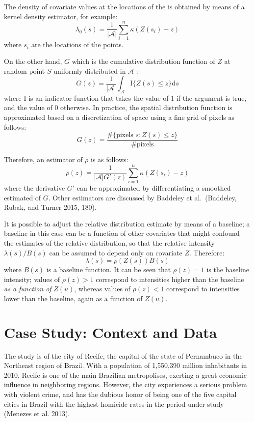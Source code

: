 \documentclass[smallextended]{svjour3}       %
\begin{document}
The density of covariate values at the locations of the is obtained by
means of a kernel density estimator, for example: \[
\lambda_0(s) = \frac{1}{|\mathcal{A}|}\sum_{i = 1}^n\kappa(Z(s_i) - z)
\] where \(s_i\) are the locations of the points.

On the other hand, \(G\) which is the cumulative distribution function
of \(Z\) at random point \(S\) uniformly distributed in \(\mathcal{A}\)
: \[
G(z) = \frac{1}{|\mathcal{A}|} \int_{\mathcal{A}}\text{I}\{Z(s)\leq z\}\text{d}s
\] where \(\text{I}\) is an indicator function that takes the value of
\(1\) if the argument is true, and the value of \(0\) otherwise. In
practice, the spatial distribution function is approximated based on a
discretization of space using a fine grid of pixels as follows: \[
G(z) = \frac{\#\{\text{pixels }s:Z(s)\leq z\}}{\# \text{pixels}}
\]

Therefore, an estimator of \(\rho\) is as follows: \[
\rho(z) = \frac{1}{|\mathcal{A}|G'(z)}\sum_{i=1}^n\kappa(Z(s_i) - z)
\] where the derivative \(G'\) can be approximated by differentiating a
smoothed estimated of \(G\). Other estimators are discussed by Baddeley
et al.~(Baddeley, Rubak, and Turner 2015, 180).

It is possible to adjust the relative distribution estimate by means of
a baseline; a baseline in this case can be a function of other
covariates that might confound the estimates of the relative
distribution, so that the relative intensity \(\lambda(s)/B(s)\) can be
assumed to depend only on covariate \(Z\). Therefore: \[
\lambda(s) = \rho(Z(s))B(s)
\] where \(B(s)\) is a baseline function. It can be seen that
\(\rho(z)=1\) is the baseline intensity; values of \(\rho(z)>1\)
correspond to intensities higher than the baseline \emph{as a function
of} \(Z(u)\), whereas values of \(\rho(z)<1\) correspond to intensities
lower than the baseline, again as a function of \(Z(u)\).

\hypertarget{case}{%
\section{Case Study: Context and Data}\label{case}}

The study is of the city of Recife, the capital of the state of
Pernambuco in the Northeast region of Brazil. With a population of
1,550,390 million inhabitants in 2010, Recife is one of the main
Brazilian metropolises, exerting a great economic influence in
neighboring regions. However, the city experiences a serious problem
with violent crime, and has the dubious honor of being one of the five
capital cities in Brazil with the highest homicide rates in the period
under study (Menezes et al. 2013).
\end{document}
